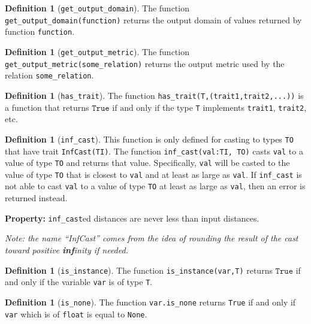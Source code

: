 \documentclass[11pt,a4paper]{article}
\theoremstyle{definition}
\newtheorem{definition}[theorem]{Definition}
\newcommand{\True}{\texttt{True}}
\newcommand{\iffText}{\text{if and only if}}
\begin{document}
\begin{definition}[\texttt{get\_output\_domain}]
    The function \texttt{get\_output\_domain(function)} returns the output domain of values returned by function \texttt{function}.
\end{definition}

\begin{definition}[\texttt{get\_output\_metric}]
    The function \texttt{get\_output\_metric(some\_relation)} returns the output metric used by the relation \texttt{some\_relation}.
\end{definition}

\begin{definition}[\texttt{has\_trait}]
    The function \texttt{has\_trait(T,(trait1,trait2,...))} is a function that returns $\True$ $\iffText$ the type \texttt{T} implements \texttt{trait1}, \texttt{trait2}, etc.
\end{definition}

\begin{definition}[\texttt{inf\_cast}]
\label{defn:inf-cast}
    This function is only defined for casting to types \texttt{TO} that have trait \texttt{InfCast(TI)}. The function \texttt{inf\_cast(val:TI, TO)} casts \texttt{val} to a value of type \texttt{TO} and returns that value. Specifically, \texttt{val} will be casted to the value of type \texttt{TO} that is closest to \texttt{val} and at least as large as \texttt{val}. If \texttt{inf\_cast} is not able to cast \texttt{val} to a value of type \texttt{TO} at least as large as \texttt{val}, then an error is returned instead.
    
    \textbf{Property:} \texttt{inf\_cast}ed distances are never less than input distances.
    
    \emph{Note: the name ``InfCast'' comes from the idea of rounding the result of the cast toward positive \textbf{inf}inity if needed.}
\end{definition}

\begin{definition}[\texttt{is\_instance}]
    The function \texttt{is\_instance(var,T)} returns $\True$ if and only if the variable \texttt{var} is of type \texttt{T}.
\end{definition}

\begin{definition}[\texttt{is\_none}]
    The function \texttt{var.is\_none} returns \texttt{True} if and only if \texttt{var} which is of \texttt{float} is equal to \texttt{None}.
\end{definition}
\end{document}
